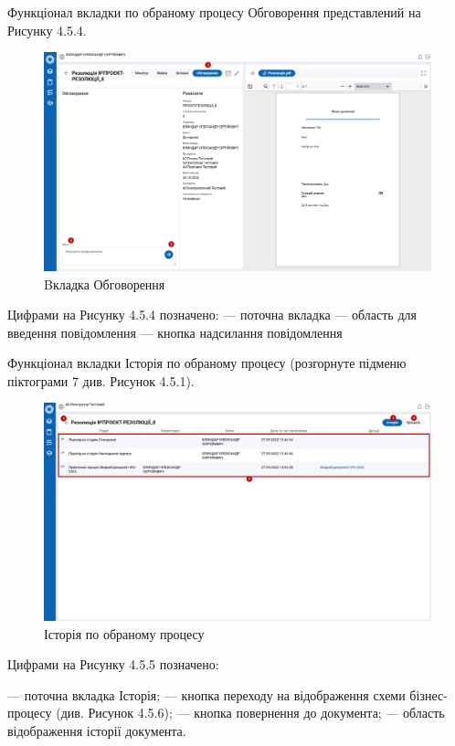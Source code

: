 Функціонал вкладки по обраному процесу Обговорення представлений на
Рисунку 4.5.4.

\begin{figure}[!htbp]
\centerline{\includegraphics[width=\textwidth]{img/4.5.4.png}}
\caption{Bкладка Обговорення}
\end{figure}

Цифрами на Рисунку 4.5.4 позначено:
 --- поточна вкладка
 --- область для введення повідомлення
 --- кнопка надсилання повідомлення

Функціонал вкладки Історія по обраному процесу (розгорнуте підменю
піктограми 7 див. Рисунок 4.5.1).

\begin{figure}[!htbp]
\centerline{\includegraphics[width=\textwidth]{img/4.5.5.png}}
\caption{Історія по обраному процесу}
\end{figure}

Цифрами на Рисунку 4.5.5 позначено:

 --- поточна вкладка Історія;
 --- кнопка переходу на відображення схеми бізнес-процесу (див. Рисунок 4.5.6);
 --- кнопка повернення до документа;
 --- область відображення історії документа.

